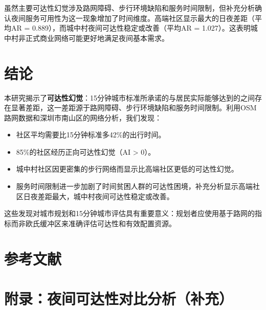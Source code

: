 \documentclass[10pt,conference]{IEEEtran}
\begin{document}
虽然主要可达性幻觉涉及路网障碍、步行环境缺陷和服务时间限制，但补充分析确认夜间服务可用性为这一现象增加了时间维度。高端社区显示最大的日夜差距（平均AR = 0.889），而城中村夜间可达性稳定或改善（平均AR = 1.027）。这表明城中村非正式商业网络可能更好地满足夜间基本需求。

\section{结论}
\label{sec:conclusion}

本研究揭示了\textbf{可达性幻觉}：15分钟城市标准所承诺的与居民实际能够达到的之间存在显著差距，这一差距源于路网障碍、步行环境缺陷和服务时间限制。利用OSM路网数据和深圳市南山区的网络分析，我们发现：

\begin{itemize}
    \item 社区平均需要比15分钟标准多42\%的出行时间。
    \item 85\%的社区经历正向可达性幻觉（AI > 0）。
    \item 城中村社区因更密集的步行网络而显示比高端社区更低的可达性幻觉。
    \item 服务时间限制进一步加剧了时间贫困人群的可达性困境，补充分析显示高端社区日夜差距最大，城中村夜间可达性稳定或改善。
\end{itemize}

这些发现对城市规划和15分钟城市评估具有重要意义：规划者应使用基于路网的指标而非欧氏缓冲区来准确评估可达性和有效配置资源。

\section*{参考文献}
\label{sec:references}




\appendices
\section{附录：夜间可达性对比分析（补充）}
\label{sec:appendix_daynight}
\end{document}
